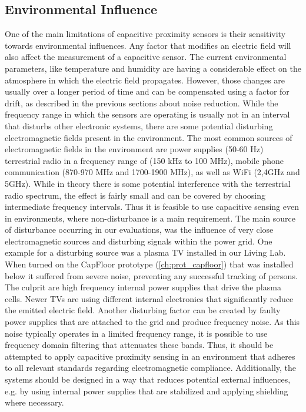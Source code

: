 \subsection{Environmental Influence}
One of the main limitations of capacitive proximity sensors is their sensitivity towards environmental influences. Any factor that modifies an electric field will also affect the measurement of a capacitive sensor. The current environmental parameters, like temperature and humidity are having a considerable effect on the atmosphere in which the electric field propagates. However, those changes are usually over a longer period of time and can be compensated using a factor for drift, as described in the previous sections about noise reduction. While the frequency range in which the sensors are operating is usually not in an interval that disturbs other electronic systems, there are some potential disturbing electromagnetic fields present in the environment. The most common sources of electromagnetic fields in the environment are power supplies (50-60 Hz) terrestrial radio in a frequency range of (150 kHz to 100 MHz), mobile phone communication (870-970 MHz and 1700-1900 MHz), as well as WiFi (2,4GHz and 5GHz). While in theory there is some potential interference with the terrestrial radio spectrum, the effect is fairly small and can be covered by choosing intermediate frequency intervals. Thus it is feasible to use capacitive sensing even in environments, where non-disturbance is a main requirement. The main source of disturbance occurring in our evaluations, was the influence of very close electromagnetic sources and disturbing signals within the power grid. One example for a disturbing source was a plasma TV installed in our Living Lab. When turned on the CapFloor prototype (\ref{ch:prot_capfloor}) that was installed below it suffered from severe noise, preventing any successful tracking of persons. The culprit are high frequency internal power supplies that drive the plasma cells. Newer TVs are using different internal electronics that significantly reduce the emitted electric field. Another disturbing factor can be created by faulty power supplies that are attached to the grid and produce frequency noise. As this noise typically operates in a limited frequency range, it is possible to use frequency domain filtering that attenuates these bands. Thus, it should be attempted to apply capacitive proximity sensing in an environment that adheres to all relevant standards regarding electromagnetic compliance. Additionally, the systems should be designed in a way that reduces potential external influences, e.g. by using internal power supplies that are stabilized and applying shielding where necessary. 
 
